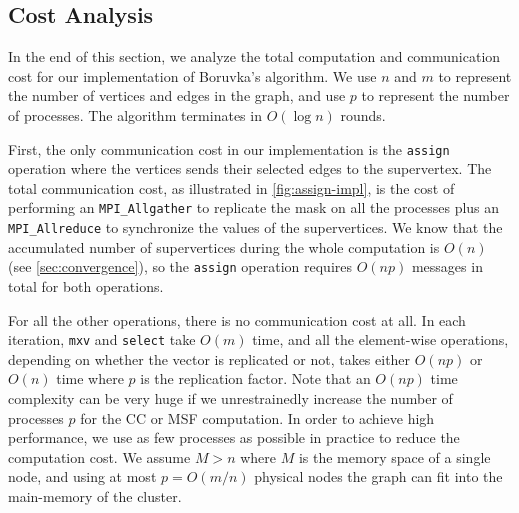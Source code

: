 \documentclass{sokendai_thesis} %
\newcommand{\boruvka}[0]{Boruvka}
\begin{document}
\subsection{Cost Analysis}
\label{sec:cost}

In the end of this section, we analyze the total computation and communication cost for our implementation of \boruvka{}'s algorithm.
We use $n$ and $m$ to represent the number of vertices and edges in the graph, and use $p$ to represent the number of processes.
The algorithm terminates in $O(\log n)$ rounds.

First, the only communication cost in our implementation is the \texttt{assign} operation where the vertices sends their selected edges to the supervertex.
The total communication cost, as illustrated in \autoref{fig:assign-impl}, is the cost of performing an \texttt{MPI\_Allgather} to replicate the mask on all the processes plus an \texttt{MPI\_Allreduce} to synchronize the values of the supervertices.
We know that the accumulated number of supervertices during the whole computation is $O(n)$ (see \autoref{sec:convergence}), so the \texttt{assign} operation requires $O(np)$ messages in total for both operations.

For all the other operations, there is no communication cost at all.
In each iteration, \texttt{mxv} and \texttt{select} take $O(m)$ time, and all the element-wise operations, depending on whether the vector is replicated or not, takes either $O(np)$ or $O(n)$ time where $p$ is the replication factor.
Note that an $O(np)$ time complexity can be very huge if we unrestrainedly increase the number of processes $p$ for the CC or MSF computation.
In order to achieve high performance, we use as few processes as possible in practice to reduce the computation cost.
We assume $M>n$ where $M$ is the memory space of a single node, and using at most $p=O(m/n)$ physical nodes the graph can fit into the main-memory of the cluster.
\end{document}
